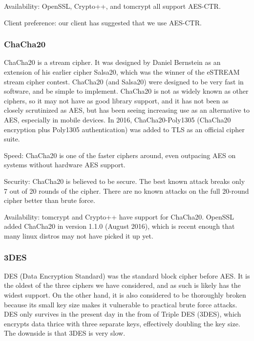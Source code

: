 Availability: OpenSSL, Crypto++, and tomcrypt all support AES-CTR.

Client preference: our client has suggested that we use AES-CTR.

\subsubsection{ ChaCha20 }

ChaCha20 \cite{chacha} is a stream cipher. It was designed by Daniel Bernstein as an extension of his earlier cipher Salsa20, which was the winner of the eSTREAM stream cipher contest.
ChaCha20 (and Salsa20) were designed to be very fast in software, and be simple to implement.
ChaCha20 is not as widely known as other ciphers, so it may not have as good library support, and it has not been as closely scrutinized as AES, but has been seeing increasing use as an alternative to AES, especially in mobile devices. In 2016, ChaCha20-Poly1305 (ChaCha20 encryption plus Poly1305 authentication) was added to TLS as an official cipher suite. \cite{rfc7905}

Speed: ChaCha20 is one of the faster ciphers around, even outpacing AES on systems without hardware AES support. \cite{eBACS}

Security: ChaCha20 is believed to be secure. The best known attack breaks only 7 out of 20 rounds of the cipher. There are no known attacks on the full 20-round cipher better than brute force.

Availability: tomcrypt and Crypto++ have support for ChaCha20. OpenSSL added ChaCha20 in version 1.1.0 (August 2016), which is recent enough that many linux distros may not have picked it up yet.

\subsubsection{ 3DES }

DES (Data Encryption Standard) was the standard block cipher before AES. It is the oldest of the three ciphers we have considered, and as such is likely has the widest support. On the other hand, it is also considered to be thoroughly broken because its small key size makes it vulnerable to practical brute force attacks. DES only survives in the present day in the from of Triple DES (3DES), which encrypts data thrice with three separate keys, effectively doubling the key size. The downside is that 3DES is very slow.

